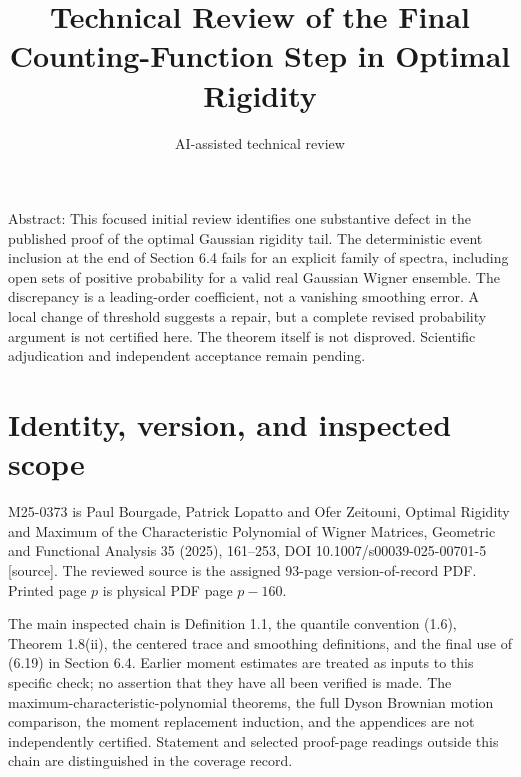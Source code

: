 \documentclass[10pt]{article}
\title{Technical Review of the Final Counting-Function Step in Optimal Rigidity}
\author{AI-assisted technical review}
\date{}
\begin{document}
\maketitle
Abstract: This focused initial review identifies one substantive defect in the published proof of the optimal Gaussian rigidity tail. The deterministic event inclusion at the end of Section 6.4 fails for an explicit family of spectra, including open sets of positive probability for a valid real Gaussian Wigner ensemble. The discrepancy is a leading-order coefficient, not a vanishing smoothing error. A local change of threshold suggests a repair, but a complete revised probability argument is not certified here. The theorem itself is not disproved. Scientific adjudication and independent acceptance remain pending.\par
\section*{Identity, version, and inspected scope}
M25-0373 is Paul Bourgade, Patrick Lopatto and Ofer Zeitouni, Optimal Rigidity and Maximum of the Characteristic Polynomial of Wigner Matrices, Geometric and Functional Analysis 35 (2025), 161–253, DOI 10.1007/s00039-025-00701-5 [source]. The reviewed source is the assigned 93-page version-of-record PDF. Printed page \(p\) is physical PDF page \(p-160\).\par
The main inspected chain is Definition 1.1, the quantile convention (1.6), Theorem 1.8(ii), the centered trace and smoothing definitions, and the final use of (6.19) in Section 6.4. Earlier moment estimates are treated as inputs to this specific check; no assertion that they have all been verified is made. The maximum-characteristic-polynomial theorems, the full Dyson Brownian motion comparison, the moment replacement induction, and the appendices are not independently certified. Statement and selected proof-page readings outside this chain are distinguished in the coverage record.\par
\end{document}
